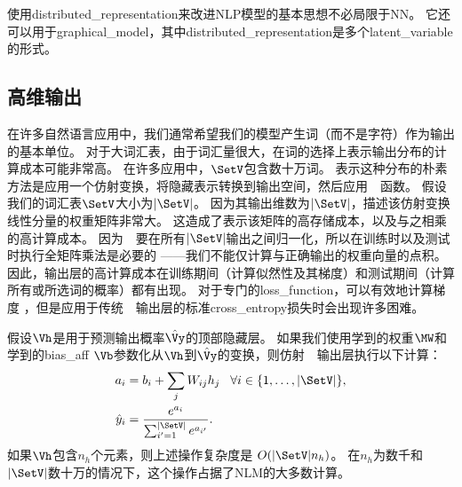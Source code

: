 
使用\gls{distributed_representation}来改进\gls{NLP}模型的基本思想不必局限于\gls{NN}。
它还可以用于\gls{graphical_model}，其中\gls{distributed_representation}是多个\gls{latent_variable}的形式。

\subsection{高维输出}
\label{sec:high_dimensional_outputs}

在许多自然语言应用中，我们通常希望我们的模型产生词（而不是字符）作为输出的基本单位。
对于大词汇表，由于词汇量很大，在词的选择上表示输出分布的计算成本可能非常高。
在许多应用中，$\SetV$包含数十万词。
表示这种分布的朴素方法是应用一个仿射变换，将隐藏表示转换到输出空间，然后应用~~函数。
假设我们的词汇表$\SetV$大小为$| \SetV |$。
因为其输出维数为$| \SetV |$，描述该仿射变换线性分量的权重矩阵非常大。
这造成了表示该矩阵的高存储成本，以及与之相乘的高计算成本。
因为~~要在所有$| \SetV |$输出之间归一化，所以在训练时以及测试时执行全矩阵乘法是必要的 ——我们不能仅计算与正确输出的权重向量的点积。
因此，输出层的高计算成本在训练期间（计算似然性及其梯度）和测试期间（计算所有或所选词的概率）都有出现。
对于专门的\gls{loss_function}，可以有效地计算梯度 \citep{Vincent2015}，但是应用于传统~~输出层的标准\gls{cross_entropy}损失时会出现许多困难。

假设$\Vh$是用于预测输出概率$\hat \Vy$的顶部隐藏层。
如果我们使用学到的权重$\MW$和学到的\gls{bias_aff} $\Vb$参数化从$\Vh$到$\hat \Vy$的变换，则仿射~~输出层执行以下计算：
\begin{align}
\label{eq:softmax-over-words}
  a_i &= b_i + \sum_j  W_{ij} h_j \;\;\; \forall i \in \{1,\ldots,|\SetV|\}, \\
  \hat{y}_i &= \frac{e^{a_i}}{\sum_{i'=1}^{|\SetV|} e^{a_{i'}}}.
\end{align}
如果$\Vh$包含$n_h$个元素，则上述操作复杂度是 $O(|\SetV| n_h)$。
在$n_h$为数千和$| \SetV |$数十万的情况下，这个操作占据了\gls{NLM}的大多数计算。


